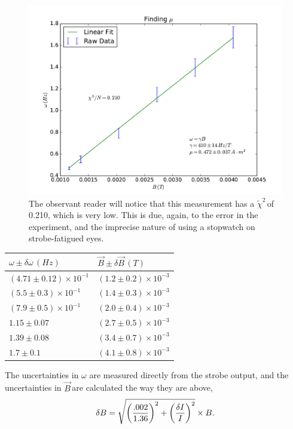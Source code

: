 \documentclass{article}
\newcommand{\redchi}{$\tilde{\chi}^2\,$}
\newcommand{\B}{$\vec{B}\,$}
\DeclarePairedDelimiter{\parens}{\lparen}{\rparen}
\begin{document}
	\begin{figure}[!htb]
		\centering
		\includegraphics[scale=.5]{../plots/omegavsb.pdf}
		\caption{The observant reader will notice that this measurement has a \redchi of 0.210, which is very low.  This is due, again, to the error in the experiment, and the imprecise nature of using a stopwatch on strobe-fatigued eyes.}
	\end{figure}

	\begin{center}
	\begin{tabular}{|l|l|}
		\hline
		$\omega \pm \delta \omega \, (H\!z)$ & $\vec{B} \pm \delta \vec{B} \, (T)$ \\
		\hline
		$(4.71 \pm 0.12) \times 10^{-1}$ & $(1.2 \pm 0.2) \times 10^{-3}$ \\
		$(5.5 \pm 0.3) \times 10^{-1}$   & $(1.4 \pm 0.3) \times 10^{-3}$ \\
		$(7.9 \pm 0.5) \times 10^{-1}$   & $(2.0 \pm 0.4) \times 10^{-3}$ \\
		$1.15 \pm 0.07$ 			     & $(2.7 \pm 0.5) \times 10^{-3}$ \\
		$1.39 \pm 0.08$ 			     & $(3.4 \pm 0.7) \times 10^{-3}$ \\
		$1.7 \pm 0.1$ 				     & $(4.1 \pm 0.8) \times 10^{-3}$ \\
		\hline
	\end{tabular}
	\end{center}

	The uncertainties in $\omega$ are measured directly from the strobe output, and the uncertainties in \B are calculated the way they are above, 
	\begin{equation*}
		\delta B = \sqrt{ \parens*{\frac{.002}{1.36}}^2 + \parens*{\frac{\delta I}{I}}^2 } \times B.
	\end{equation*}
	
\end{document}
